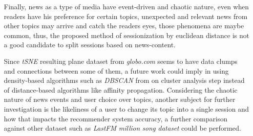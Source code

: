 \documentclass[ecp,tc,english]{iiufrgs}
\begin{document}
Finally, news as a type of media have event-driven and chaotic nature, even when readers have his preference for certain topics, unexpected and relevant news from other topics may arrive and catch the readers eyes, those phenomena are maybe common, thus, the proposed method of sessionization by euclidean distance is not a good candidate to split sessions based on news-content.

Since \textit{tSNE} resulting plane dataset from \textit{globo.com} seems to have data clumps and connections between some of them, a future work could imply in using density-based algorithms such as \textit{DBSCAN} from \cite{ester1996} on cluster analysis step instead of distance-based algorithms like affinity propagation. Considering the chaotic nature of news events and user choice over topics, another subject for further investigation is the likeliness of a user to change its topic into a single session and how that impacts the recommender system accuracy, a further comparison against other dataset such as \textit{LastFM million song dataset} could be performed.


% 

\end{document}
